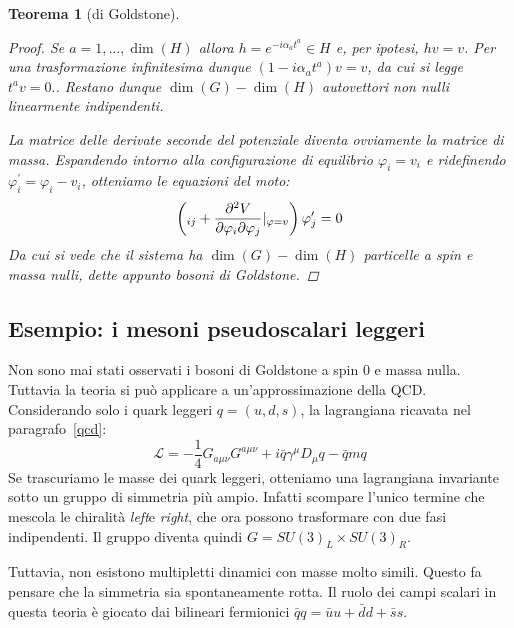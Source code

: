 \documentclass[italian,a4paper]{article}
\newtheorem*{theorem}{Teorema}
\theoremstyle{definition}
\newcommand{\lagr}{\ensuremath{\mathscr{L}}}
\newcommand{\Dimu}{\ensuremath{D_{\mu}}}
\begin{document}
\begin{theorem}[di Goldstone]
\begin{proof}
        Se $a = 1,\ldots, \dim(H)$ allora $h = e^{-i \alpha_a t^a} \in H$ e,
        per ipotesi, $hv = v$. Per una trasformazione infinitesima dunque
        $(1 - i\alpha_a t^a) v = v$, da cui si legge $t^a v = 0.$.
        Restano dunque $\dim(G) - \dim(H)$ autovettori non nulli linearmente
        indipendenti.

        La matrice delle derivate seconde del potenziale diventa ovviamente
        la matrice di massa. Espandendo intorno alla configurazione di
        equilibrio $\varphi_i = v_i$ e ridefinendo $\varphi_i^\prime = \varphi_i -
        v_i$, otteniamo le equazioni del moto:
        \begin{equation*}
            \left( \box \delta_{ij} + \dfrac{\partial^2 V}{\partial
            \varphi_i \partial \varphi_j}|_{\varphi = v} \right) \varphi^\prime_j
            = 0
        \end{equation*}
        Da cui si vede che il sistema ha $\dim(G) - \dim(H)$ particelle a
        spin e massa nulli, dette appunto bosoni di Goldstone.
    \end{proof}
\end{theorem}
\subsection*{Esempio: i mesoni pseudoscalari leggeri}
Non sono mai stati osservati i bosoni di Goldstone a spin $0$ e massa nulla.
Tuttavia la teoria si pu\`o applicare a un'approssimazione della QCD.
Considerando solo i quark leggeri $q = (u, d, s)$, la lagrangiana ricavata nel paragrafo~\ref{qcd}:
    \begin{equation*}
        \lagr = - \dfrac{1}{4}G_{a\mu\nu}G^{a\mu\nu} + i \bar q
        \gamma^\mu\Dimu q - \bar q m q
    \end{equation*}
Se trascuriamo le masse dei quark leggeri, otteniamo una lagrangiana
invariante sotto un gruppo di simmetria pi\`u ampio. Infatti scompare
l'unico termine che mescola le chiralit\`a \emph{left}e \emph{right}, che
ora possono trasformare con due fasi indipendenti. Il gruppo diventa quindi
$G = SU(3)_L \times SU(3)_R$.

Tuttavia, non esistono multipletti dinamici con masse molto simili. Questo
fa pensare che la simmetria sia spontaneamente rotta. Il ruolo dei campi
scalari in questa teoria \`e giocato dai bilineari fermionici $\bar q q = \bar u u +
\bar d d + \bar s s$.
\end{document}
